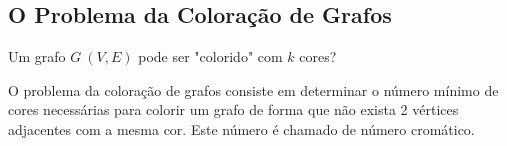 \subsection{O Problema da Coloração de Grafos}
Um grafo $G\:(V,E)$ pode ser "colorido" com $k$ cores?

O problema da coloração de grafos consiste em determinar o número mínimo de cores
necessárias para colorir um grafo de forma que não exista 2 vértices adjacentes com a mesma cor. 
Este número é chamado de número cromático.
